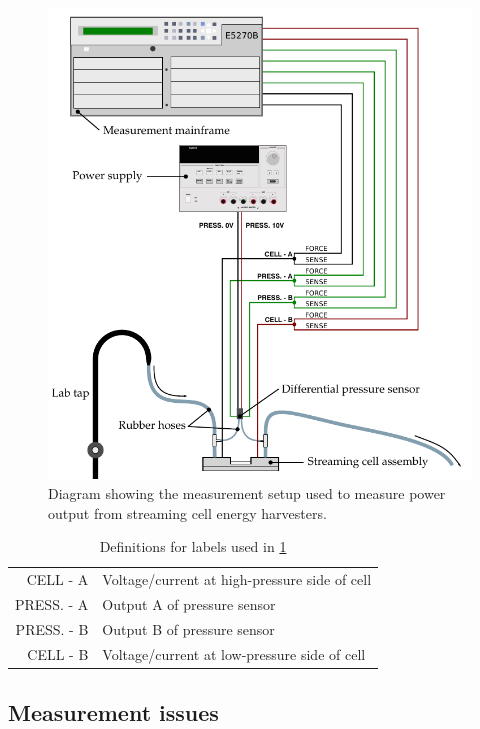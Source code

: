     \begin{figure}
        \includegraphics{content/pt1/01-PowerHarvesting/graphics/measurementSetup}
        \caption{\label{fig:measurementSetup}Diagram showing the measurement setup used to measure power output from streaming cell energy harvesters.}
    \end{figure}

    \begin{table}
        \centering
        \begin{tabular}{r|l}
        CELL - A & Voltage/current at high-pressure side of cell\\
        PRESS. - A & Output A of pressure sensor\\
        PRESS. - B & Output B of pressure sensor\\
        CELL - B & Voltage/current at low-pressure side of cell
        \end{tabular}
        \caption{\label{tab:measurementSetup_legend}Definitions for labels used in \ref{fig:measurementSetup}}
    \end{table}


  \subsection{Measurement issues}


